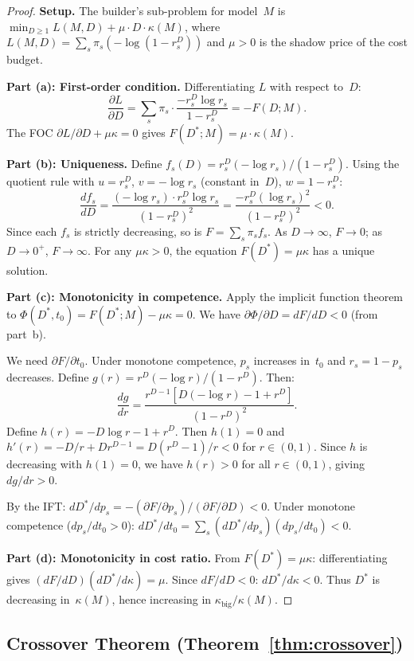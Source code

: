 \documentclass[twoside,11pt]{article}
\newcommand{\Dstar}{D^*}
\newcommand{\kappabig}{\kappa_{\mathrm{big}}}
\begin{document}
\begin{proof}
\noindent\textbf{Setup.}
The builder's sub-problem for model~$M$ is
$\min_{D \ge 1} L(M,D) + \mu \cdot D \cdot \kappa(M)$,
where $L(M,D) = \sum_s \pi_s (-\log(1 - r_s^D))$ and $\mu > 0$ is the shadow price of the cost budget.

\noindent\textbf{Part (a): First-order condition.}
Differentiating $L$ with respect to~$D$:
\[
  \frac{\partial L}{\partial D}
  = \sum_s \pi_s \cdot \frac{-r_s^D \log r_s}{1 - r_s^D}
  = -F(D; M).
\]
The FOC $\partial L/\partial D + \mu \kappa = 0$ gives $F(\Dstar; M) = \mu \cdot \kappa(M)$.

\noindent\textbf{Part (b): Uniqueness.}
Define $f_s(D) = r_s^D (-\log r_s) / (1 - r_s^D)$.
Using the quotient rule with $u = r_s^D$, $v = -\log r_s$ (constant in~$D$), $w = 1 - r_s^D$:
\[
  \frac{df_s}{dD} = \frac{(-\log r_s) \cdot r_s^D \log r_s}{(1-r_s^D)^2}
  = \frac{-r_s^D (\log r_s)^2}{(1-r_s^D)^2} < 0.
\]
Since each $f_s$ is strictly decreasing, so is $F = \sum_s \pi_s f_s$.
As $D \to \infty$, $F \to 0$; as $D \to 0^+$, $F \to \infty$.
For any $\mu \kappa > 0$, the equation $F(\Dstar) = \mu \kappa$ has a unique solution.

\noindent\textbf{Part (c): Monotonicity in competence.}
Apply the implicit function theorem to $\Phi(\Dstar, t_0) = F(\Dstar; M) - \mu\kappa = 0$.
We have $\partial \Phi / \partial D = dF/dD < 0$ (from part~b).

We need $\partial F / \partial t_0$.
Under monotone competence, $p_s$ increases in~$t_0$ and $r_s = 1-p_s$ decreases.
Define $g(r) = r^D(-\log r)/(1-r^D)$.
Then:
\[
  \frac{dg}{dr} = \frac{r^{D-1}[D(-\log r) - 1 + r^D]}{(1-r^D)^2}.
\]
Define $h(r) = -D\log r - 1 + r^D$.
Then $h(1) = 0$ and $h'(r) = -D/r + Dr^{D-1} = D(r^D - 1)/r < 0$ for $r \in (0,1)$.
Since $h$ is decreasing with $h(1) = 0$, we have $h(r) > 0$ for all $r \in (0,1)$, giving $dg/dr > 0$.

By the IFT:
$d\Dstar/dp_s = -(\partial F/\partial p_s) / (\partial F/\partial D) < 0$.
Under monotone competence ($dp_s/dt_0 > 0$):
$d\Dstar/dt_0 = \sum_s (d\Dstar/dp_s)(dp_s/dt_0) < 0$.

\noindent\textbf{Part (d): Monotonicity in cost ratio.}
From $F(\Dstar) = \mu\kappa$: differentiating gives $(dF/dD)(d\Dstar/d\kappa) = \mu$.
Since $dF/dD < 0$: $d\Dstar/d\kappa < 0$.
Thus $\Dstar$ is decreasing in~$\kappa(M)$, hence increasing in $\kappabig/\kappa(M)$.
\end{proof}

\subsection{Crossover Theorem (Theorem~\ref{thm:crossover})}
\label{app:crossover}
\end{document}
